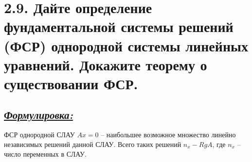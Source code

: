 \documentclass{article}
\begin{document}
\section*{\LARGE 2.9. Дайте определение фундаментальной системы решений (ФСР) однородной системы линейных уравнений. Докажите теорему о существовании ФСР. }
\subsection*{\Large \underline{\textit{Формулировка: }}}
ФСР однородной СЛАУ $Ax = 0$ -- наибольшее возможное множество линейно независимых решений данной СЛАУ. Всего таких решений $n_x -  RgA$, где $n_x$ -- число переменных в СЛАУ.
\end{document}
